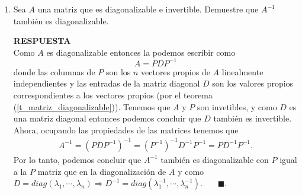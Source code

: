\documentclass[11pt,letterpaper]{article}
\newcommand{\res}{\textbf{RESPUESTA}\\}
\newcommand{\fin}{$\blacksquare.$}
\newtheorem{thmt}{Teorema:}
\newtheorem{thmd}{Definición:}
\begin{document}
\begin{enumerate}
\begin{framed}
\begin{thmd}
	La multiplicidad geométrica de un valor propio es menor o igual que su multiplicidad algebraica.
    \end{thmd}
\end{framed}
\begin{framed}
    \begin{thmt} \label{t_diagonizable_multiplicidad}
	(Visto en clase, pag. 131) Sea $A$ una matriz $n\times n$. $A$ es diagonalizable si y solo si la multiplicidad geométrica de cada valor propio es igual a su multiplicidad algebraica; es decir si la suma de las dimensiones de los espacios propios es igual a $n$. 
    \end{thmt}
\end{framed}
Con lo anterior, denotamos a $g_1, g_2$ las multiplicidades geométricas de $\lambda_1, \lambda_2$ respectivamente y a $a_1,a_2$ las multiplicidades algebraicas de $\lambda_1, \lambda_2$ respectivamente. Ocupando la (\ref{d_multiplicidad}) tenemos que 
\begin{align*}
a_1\geq g_1=n-1, \ \ \ \ y \ \ \ a_2\geq g_2\geq1.
\end{align*}
Pero como sabemos que $a_1+a_2=n$ (por definición de polinomio característico (\ref{d_polinomio_car})), entonces esto implica que 
\begin{align*}
a_1=g_1=n-1, \ \ \ \ y \ \ \ a_2= g_2=1.
\end{align*}
Y ocupando el teorema (\ref{t_diagonizable_multiplicidad}), como la multiplicidad de cada valor propio es igual a su multiplicidad algebraica podemos concluir que $A$ es diagonalizable. \ \ \ \fin

\item Sea $A$ una matriz que es diagonalizable e invertible. Demuestre que $A^{-1}$ también es diagonalizable.

\res Como $A$ es diagonalizable entonces la podemos escribir como 
$$A=PDP^{-1}$$
donde las columnas de $P$ son los $n$ vectores propios de $A$ linealmente independientes y las entradas de la matriz diagonal $D$ son los valores propios correspondientes a los vectores propios (por el teorema (\ref{t_matriz_diagonalizable})). Tenemos que $A$ y $P$ son invetibles, y como $D$ es una matriz diagonal entonces podemos concluir que $D$ también es invertible. Ahora, ocupando las propiedades de las matrices tenemos que 
\begin{align*}
A^{-1}=(PDP^{-1})^{-1}=(P^{-1})^{-1}D^{-1}P^{-1}=PD^{-1}P^{-1}.
\end{align*} 
Por lo tanto, podemos concluir que  $A^{-1}$ también es diagonalizable con $P$ igual a la $P$ matriz que en la diagonalización de $A$ y como $D=diag(\lambda_1, \cdots,\lambda_n )\Rightarrow D^{-1}=diag(\lambda_1^{-1}, \cdots, \lambda_n^{-1})$. \ \ \ \fin 


\end{enumerate}
\end{document}
